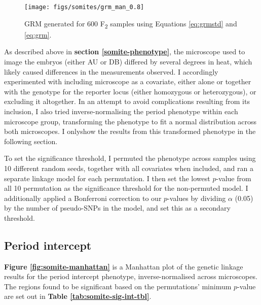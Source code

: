 \documentclass[
]{book}
\begin{document}
\begin{figure}
\texttt{[image: figs/somites/grm\_man\_0.8]} \caption{GRM generated for 600 F\textsubscript{2} samples using Equations \eqref{eq:grmstd} and \eqref{eq:grm}.}\label{fig:somite-grm}
\end{figure}

As described above in \textbf{section \ref{somite-phenotype}}, the microscope used to image the embryos (either AU or DB) differed by several degrees in heat, which likely caused differences in the measurements observed. I accordingly experimented with including microscope as a covariate, either alone or together with the genotype for the reporter locus (either homozygous or heterozygous), or excluding it altogether. In an attempt to avoid complications resulting from its inclusion, I also tried inverse-normalising the period phenotype within each microscope group, transforming the phenotype to fit a normal distribution across both microscopes. I onlyshow the results from this transformed phenotype in the following section.

To set the significance threshold, I permuted the phenotype across samples using 10 different random seeds, together with all covariates when included, and ran a separate linkage model for each permutation. I then set the lowest \(p\)-value from all 10 permutation as the significance threshold for the non-permuted model. I additionally applied a Bonferroni correction to our \(p\)-values by dividing \(\alpha\) (0.05) by the number of pseudo-SNPs in the model, and set this as a secondary threshold.

\hypertarget{period-intercept}{%
\subsection{Period intercept}\label{period-intercept}}

\textbf{Figure \ref{fig:somite-manhattan}} is a Manhattan plot of the genetic linkage results for the period intercept phenotype, inverse-normalised across microscopes. The regions found to be significant based on the permutations' minimum \(p\)-value are set out in \textbf{Table \ref{tab:somite-sig-int-tbl}}.
\end{document}
